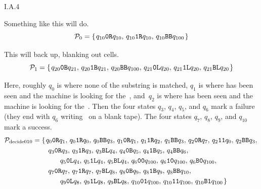 %
\begin{ans}{I.A.4}
\begin{exparts}
\item
Something like this will do.
\begin{equation*}
  \TM_0=\set{\tminstruction{10}{0}{R}{10},\,
       \tminstruction{10}{1}{R}{10},\,
       \tminstruction{10}{B}{B}{100} }
\end{equation*}
\item
This will back up, blanking out cells.
\begin{equation*}
  \TM_1=\set{
       \tminstruction{20}{0}{B}{21},\,
       \tminstruction{20}{1}{B}{21},\,
       \tminstruction{20}{B}{B}{100},\,
       \tminstruction{21}{0}{L}{20},\,
       \tminstruction{21}{1}{L}{20},\,
       \tminstruction{21}{B}{L}{20}
      }
\end{equation*}
\item Here, roughly $q_0$ is where none of the substring is matched,
$q_1$ is where  has been seen and the machine is looking for
the~,
and~$q_2$ is where  has been seen and the machine is looking for
the~.
Then the four states $q_3$, $q_4$, $q_5$, and $q_6$ mark a failure
(they end with $q_6$ writing~ on a blank tape).
The four states $q_7$, $q_8$, $q_9$, and $q_{10}$ mark a success.
\begin{align*}
  \TM_{\text{decide010}}
  &=
  \{\hspace{\setspacing} \tminstruction{0}{0}{R}{1},\,
        \tminstruction{0}{1}{R}{0},\,
        \tminstruction{0}{B}{B}{3},\,
        \tminstruction{1}{0}{R}{1},\,
        \tminstruction{1}{1}{R}{2},\,
        \tminstruction{1}{B}{B}{3},\,
        \tminstruction{2}{0}{R}{7},\,
        \tminstruction{2}{1}{1}{0},\,
        \tminstruction{2}{B}{B}{3},\,        \\
        &\qquad\;
        \tminstruction{3}{0}{R}{3},\,
        \tminstruction{3}{1}{R}{3},\,
        \tminstruction{3}{B}{L}{4},\,
        \tminstruction{4}{0}{B}{5},\,
        \tminstruction{4}{1}{B}{5},\,
        \tminstruction{4}{B}{B}{6},\,   \\  %
        &\qquad\qquad\tminstruction{5}{0}{L}{4},\,
        \tminstruction{5}{1}{L}{4},\,
        \tminstruction{5}{B}{L}{4},\,
        \tminstruction{6}{0}{0}{100},\,
        \tminstruction{6}{1}{0}{100},\,
        \tminstruction{6}{B}{0}{100},\,      \\
        &\qquad\;
        \tminstruction{7}{0}{R}{7},\,
        \tminstruction{7}{1}{R}{7},\,
        \tminstruction{7}{B}{L}{8},\,
        \tminstruction{8}{0}{B}{9},\,
        \tminstruction{8}{1}{B}{9},\,
        \tminstruction{8}{B}{B}{10},\,      \\  %
        &\qquad\qquad\tminstruction{9}{0}{L}{8},\,
        \tminstruction{9}{1}{L}{8},\,
        \tminstruction{9}{B}{L}{8},\,
        \tminstruction{10}{0}{1}{100},\,
        \tminstruction{10}{1}{1}{100},\,
        \tminstruction{10}{B}{1}{100}
      \hspace{\setspacing}\}
\end{align*}
\end{exparts}
\end{ans}
